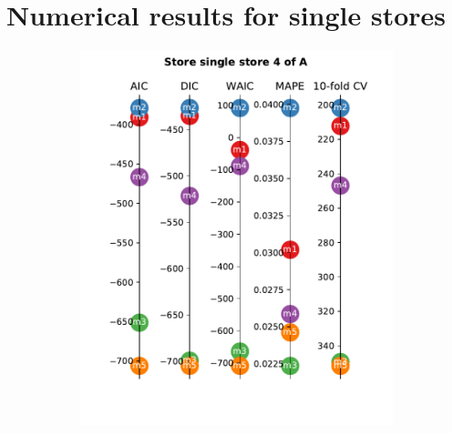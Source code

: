 \documentclass[english, 12pt, a4paper, sci, utf8, a-1b, online]{aaltothesis}
\begin{document}

\clearpage
\thesisappendix

\section{Numerical results for single stores\label{app:single_store_results}}

\begin{figure}
	\begin{subfigure}[htb]{0.33\textwidth}
		\centering
		\includegraphics[width=\textwidth]{../plots/metrics/metrics_plot_single_store_4_of_A.pdf}
	\end{subfigure}
	\begin{subfigure}[htb]{0.33\textwidth}
		\centering

\end{subfigure}
\end{figure}
\end{document}
